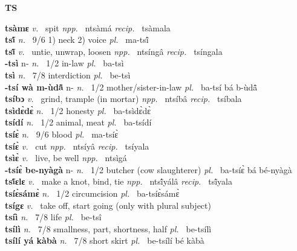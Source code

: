 \medskip
\noindent \large {\bfseries TS}\normalsize\\
\medskip

\noindent
{\bfseries tsàmɛ}  {\itshape v.~} spit   {\itshape npp.~} ntsàmá {\itshape recip.~} tsàmala  \\ 
{\bfseries tsĩ́}  {\itshape n.~} 9/6 1) neck 2) voice {\itshape pl.~} ma-tsĩ́    \\ 
{\bfseries tsĩ̂}  {\itshape v.~} untie, unwrap, loosen   {\itshape npp.~} ntsíngâ {\itshape recip.~} tsíngala \\ 
{\bfseries -tsì} n- {\itshape n.~} 1/2 in-law {\itshape pl.~} ba-tsì    \\ 
{\bfseries tsì}  {\itshape n.~} 7/8 interdiction {\itshape pl.~} be-tsì    \\ 
{\bfseries -tsí wà m-ùdã̂} n- {\itshape n.~} 1/2 mother/sister-in-law {\itshape pl.~} ba-tsí bá b-ùdã̂    \\ 
{\bfseries tsíbɔ}  {\itshape v.~} grind, trample (in mortar)   {\itshape npp.~} ntsíbâ {\itshape recip.~} tsíbala  \\ 
{\bfseries tsìdɛ̀dɛ̀}  {\itshape n.~} 1/2 honesty {\itshape pl.~} ba-tsìdɛ̀dɛ̀    \\ 
{\bfseries tsídí}  {\itshape n.~} 1/2 animal, meat {\itshape pl.~} ba-tsídí    \\ 
{\bfseries tsíɛ̀}  {\itshape n.~} 9/6 blood {\itshape pl.~} ma-tsíɛ̀    \\ 
{\bfseries tsíɛ̀}  {\itshape v.~} cut   {\itshape npp.~} ntsíyâ {\itshape recip.~} tsíyala  \\ 
{\bfseries tsìɛ̀}  {\itshape v.~} live, be well   {\itshape npp.~} ntsìgá  \\ 
{\bfseries -tsíɛ̀ be-nyàgà} n- {\itshape n.~} 1/2 butcher (cow slaughterer) {\itshape pl.~} ba-tsíɛ̀ bá bé-nyàgà    \\ 
{\bfseries tsĩ́ɛlɛ}  {\itshape v.~} make a knot, bind, tie   {\itshape npp.~} ntsĩ́yálâ {\itshape recip.~} tsĩ́yala  \\ 
{\bfseries tsíɛ̀sámɛ̀}  {\itshape n.~} 1/2 circumcision {\itshape pl.~} ba-tsíɛ̀sámɛ̀    \\ 
{\bfseries tsígɛ}  {\itshape v.~} take off, start going (only with plural subject)    \\ 
{\bfseries tsíì}  {\itshape n.~} 7/8 life {\itshape pl.~} be-tsî    \\ 
{\bfseries tsílì}  {\itshape n.~} 7/8 smallness, part, shortness, half {\itshape pl.~} be-tsílì    \\ 
{\bfseries tsílí yá kàbà}  {\itshape n.~} 7/8 short skirt {\itshape pl.~} be-tsílí bé kàbà    \\ 
